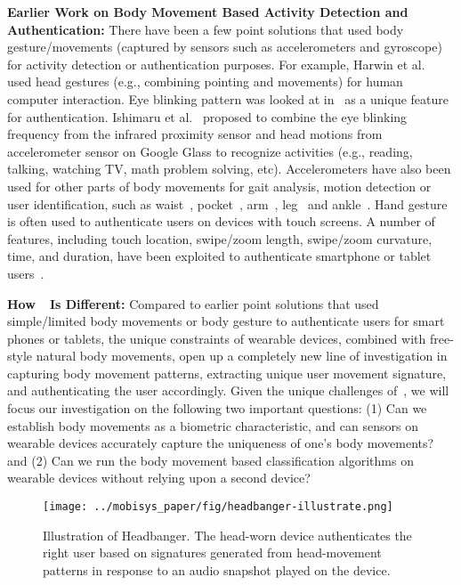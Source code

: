 \vspace{4pt}\textbf{Earlier Work on Body Movement Based Activity Detection and Authentication:} There have been a few point solutions that used body gesture/movements (captured by sensors such as accelerometers and gyroscope) for activity detection or authentication purposes. For example, Harwin et al.~\cite{harwin1990analysis} used head gestures (e.g., combining pointing and movements) for human computer interaction. Eye blinking pattern was looked at in~\cite{westeyn2004recognizing} as a unique feature for authentication. Ishimaru et al.~\cite{ishimaru2014blink} proposed to combine the eye blinking frequency from the infrared proximity sensor and head motions from accelerometer sensor on Google Glass to recognize activities (e.g., reading, talking, watching TV, math problem solving, etc).
Accelerometers have also been used for other parts of body movements for gait analysis, motion detection or user identification, such as waist~\cite{ailisto2005identifying}, pocket~\cite{gafurov2007gait}, arm~\cite{okumura2006study,gafurov2008arm}, leg~\cite{gafurov2006biometric,karantonis2006implementation,mantyjarvi2005identifying,derawi2010unobtrusive} and ankle~\cite{gafurov2011user}.
Hand gesture is often used to authenticate users on devices with touch screens.  A number of  features, including touch location, swipe/zoom length,
swipe/zoom curvature, time, and duration, have been exploited to authenticate smartphone or tablet users~\cite{sae2012biometric,frank2013touchalytics,cai2013mobile,feng2014tips,liu2009uwave,shahzad2013secure}.

\vspace{4pt}\textbf{How~\systemname~Is Different:} Compared to earlier point solutions that used simple/limited body movements or body gesture to authenticate users for smart phones or tablets, the unique constraints of wearable devices, combined with free-style natural body movements,  open up a completely new line of investigation in capturing body movement patterns, extracting unique user movement signature, and authenticating the user accordingly. Given the unique challenges of~\systemname, we will focus our investigation on the following two important questions: (1) Can we establish body movements as a biometric characteristic, and can sensors on wearable devices accurately capture the uniqueness of one's body movements? and (2) Can we run the body movement based classification algorithms on wearable devices without relying upon a second device?

\begin{figure}[t]
\centering
\texttt{[image: ../mobisys\_paper/fig/headbanger-illustrate.png]}
\caption{Illustration of Headbanger. The head-worn device authenticates the
right user based on signatures generated from head-movement patterns in
response to an audio snapshot played on the device.}
\label{fig:illustrate}
\end{figure}



